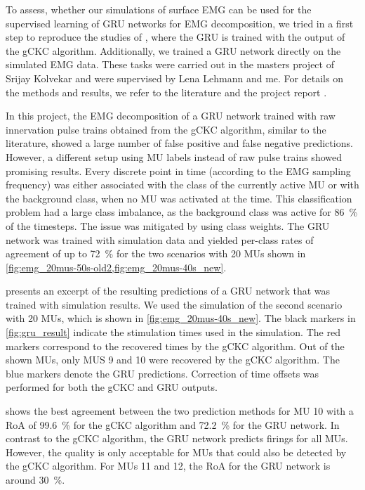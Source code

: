 To assess, whether our simulations of surface EMG can be used for the supervised learning of GRU networks for EMG decomposition, we tried in a first step to reproduce the studies of \cite{Clarke2021}, where the GRU is trained with the output of the gCKC algorithm. Additionally, we trained a GRU network directly on the simulated EMG data. These tasks were carried out in the masters project of Srijay Kolvekar and were supervised by Lena Lehmann and me. For details on the methods and results, we refer to the literature \cite{Clarke2021} and the project report \cite{Srijay}.

In this project, the EMG decomposition of a GRU network trained with raw innervation pulse trains obtained from the gCKC algorithm, similar to the literature, showed a large number of false positive and false negative predictions.
However, a different setup using MU labels instead of raw pulse trains showed promising results. 
Every discrete point in time (according to the EMG sampling frequency) was either associated with the class of the currently active MU or with the background class, when no MU was activated at the time. This classification problem had a large class imbalance, as the background class was active for \SI{86}{\percent} of the timesteps. The issue was mitigated by using class weights. The GRU network was trained with simulation data and yielded per-class rates of agreement of up to \SI{72}{\percent} for the two scenarios with 20 MUs shown in \cref{fig:emg_20mus-50s-old2,fig:emg_20mus-40s_new}. 

 presents an excerpt of the resulting predictions of a GRU network that was trained with simulation results.
We used the simulation of the second scenario with 20 MUs, which is shown in \cref{fig:emg_20mus-40s_new}. 
The black markers in \cref{fig:gru_result} indicate the stimulation times used in the simulation. 
The red markers correspond to the recovered times by the gCKC algorithm. 
Out of the shown MUs, only MUS 9 and 10 were recovered by the gCKC algorithm.
The blue markers denote the GRU predictions. Correction of time offsets was performed for both the gCKC and GRU outputs.

 shows the best agreement between the two prediction methods for MU 10 with a RoA of \SI{99.6}{\percent} for the gCKC algorithm and \SI{72.2}{\percent} for the GRU network. In contrast to the gCKC algorithm, the GRU network predicts firings for all MUs. However, the quality is only acceptable for MUs that could also be detected by the gCKC algorithm. For MUs 11 and 12, the RoA for the GRU network is around \SI{30}{\percent}.

